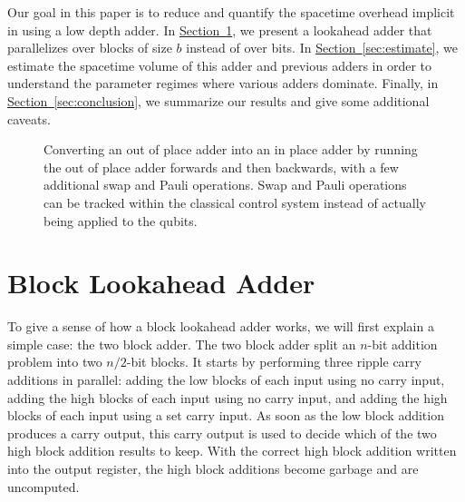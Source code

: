 \documentclass[onecolumn,unpublished]{quantumarticle}
\theoremstyle{definition}
\theoremstyle{definition}
\theoremstyle{definition}
\renewcommand{\sec}[1]{\hyperref[sec:#1]{Section~\ref*{sec:#1}}}
\begin{document}
Our goal in this paper is to reduce and quantify the spacetime overhead implicit in using a low depth adder.
In \sec{block}, we present a lookahead adder that parallelizes over blocks of size $b$ instead of over bits.
In \sec{estimate}, we estimate the spacetime volume of this adder and previous adders in order to understand the parameter regimes where various adders dominate.
Finally, in \sec{conclusion}, we summarize our results and give some additional caveats.


\begin{figure}
\centering
{}
    \caption{
        Converting an out of place adder into an in place adder by running the out of place adder forwards and then backwards, with a few additional swap and Pauli operations.
        Swap and Pauli operations can be tracked within the classical control system instead of actually being applied to the qubits.
    }
    \label{fig:oop2ip}
\end{figure}

\section{Block Lookahead Adder}
\label{sec:block}

To give a sense of how a block lookahead adder works, we will first explain a simple case: the two block adder.
The two block adder split an $n$-bit addition problem into two $n/2$-bit blocks.
It starts by performing three ripple carry additions in parallel: adding the low blocks of each input using no carry input, adding the high blocks of each input using no carry input, and adding the high blocks of each input using a set carry input.
As soon as the low block addition produces a carry output, this carry output is used to decide which of the two high block addition results to keep.
With the correct high block addition written into the output register, the high block additions become garbage and are uncomputed.
\end{document}

